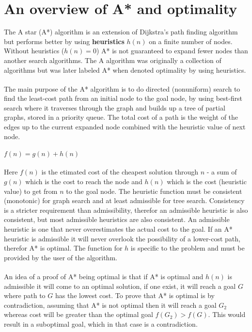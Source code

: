 \documentclass[a4paper]{article}
\begin{document}
\section{An overview of A* and optimality}
The A star (A*) algorithm is an extension of Dijkstra's path finding algorithm but performs better by using \textbf{heuristics} $h(n)$ on a finite number of nodes. Without heuristics ($h(n) = 0$) A* is not guaranteed to expand fewer nodes than another search algorithms. The A algorithm was originally a collection of algorithms but was later labeled A* when denoted optimality by using heuristics.\\
\\
The main purpose of the A* algorithm is to do directed (nonuniform) search to find the least-cost path from an initial node to the goal node, by using best-first search where it traverses through the graph and builds up a tree of partial graphs, stored in a priority queue. The total cost of a path is the weight of the edges up to the current expanded node combined with the heuristic value of next node.\\
\\
$f(n) = g(n) + h(n)$ \\
\\
Here $f(n)$ is the etimated cost of the cheapest solution through $n$ - a sum of $g(n)$ which is the cost to reach the node and $h(n)$ which is the cost (heuristic value) to get from $n$ to the goal node. The heuristic function must be consistent (monotonic) for graph search and at least admissible for tree search. Consistency is a stricter requirement than admissibility, therefor an admissible heuristic is also consistent, but most admissible heuristics are also consistent. An admissible heuristic is one that never overestimates the actual cost to the goal. If an A* heuristic is admissible it will never overlook the possibility of a lower-cost path, therefor A* is optimal. The function for $h$ is specific to the problem and must be provided by the user of the algorithm. \\
\\
An idea of a proof of A* being optimal is that if A* is optimal and $h(n)$ is admissible it will come to an optimal solution, if one exist, it will reach a goal $G$ where path to $G$ has the lowest cost. To prove that A* is optimal is by contradiction, assuming that A* is not optimal then it will reach a goal $G_2$ whereas cost will be greater than the optimal goal $f(G_2) > f(G)$. This would result in a suboptimal goal, which in that case is a contradiction.
\end{document}
